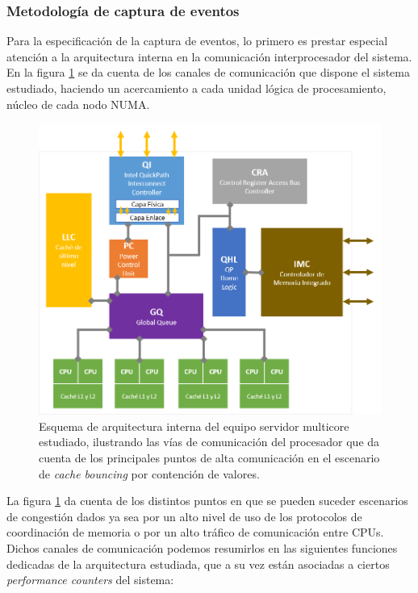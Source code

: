 \subsubsection{Metodología de captura de eventos}
Para la especificación de la captura de eventos, lo primero es prestar especial atención a la arquitectura interna en la comunicación interprocesador del sistema. En la figura \ref{fig:hwcomm} se da cuenta de los canales de comunicación que dispone el sistema estudiado, haciendo un acercamiento a cada unidad lógica de procesamiento, núcleo de cada nodo NUMA.

\begin{figure}[!h]
	\centering
	\includegraphics[scale=.8]{imagenes/QuickPathChannels.png}
	\caption{Esquema de arquitectura interna del equipo servidor multicore estudiado, ilustrando las vías de comunicación del procesador que da cuenta de los principales puntos de alta comunicación en el escenario de \textit{cache bouncing} por contención de valores.}
	\label{fig:hwcomm}
\end{figure}

La figura \ref{fig:hwcomm} da cuenta de los distintos puntos en que se pueden suceder escenarios de congestión dados ya sea por un alto nivel de uso de los protocolos de coordinación de memoria o por un alto tráfico de comunicación entre CPUs. Dichos canales de comunicación podemos resumirlos en las siguientes funciones dedicadas de la arquitectura estudiada, que a su vez están asociadas a ciertos \emph{performance counters} del sistema:

